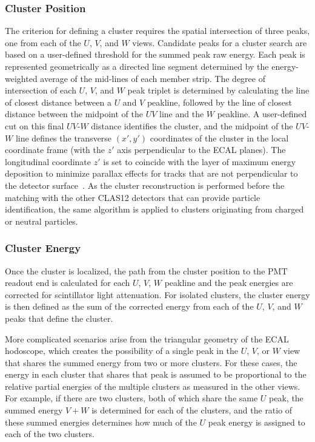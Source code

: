 \subsubsection {Cluster Position}
\label{ec-cluster}

The criterion for defining a cluster requires the spatial intersection of three peaks, one from each of the $U$,
$V$, and $W$ views. Candidate peaks for a cluster search are based on a user-defined threshold for the
summed peak raw energy. Each peak is represented geometrically as a directed line segment determined by the
energy-weighted average of the mid-lines of each member strip. The degree of intersection of each $U$, $V$,
and $W$ peak triplet is determined by calculating the line of closest distance between a $U$ and $V$ peakline,
followed by the line of closest distance between the midpoint of the $UV$ line and the $W$ peakline. A
user-defined cut on this final $UV$-$W$ distance identifies the cluster, and the midpoint of the $UV$-$W$
line defines the transverse $(x',y')$ coordinates of the cluster in the local coordinate frame (with the $z'$
axis perpendicular to the ECAL planes). The longitudinal coordinate $z'$ is set to coincide with the layer of
maximum energy deposition to minimize parallax effects for tracks that are not perpendicular to the detector
surface~\cite{ecal-nim}. As the cluster reconstruction is performed before the matching with the other CLAS12
detectors that can provide particle identification, the same algorithm is applied to clusters originating from
charged or neutral particles.

\subsubsection {Cluster Energy}

Once the cluster is localized, the path from the cluster position to the PMT readout end is calculated for each $U$,
$V$, $W$ peakline and the peak energies are corrected for scintillator light attenuation. For isolated clusters,
the cluster energy is then defined as the sum of the corrected energy from each of the $U$, $V$, and $W$ peaks
that define the cluster.

More complicated scenarios arise from the triangular geometry of the ECAL hodoscope, which creates the
possibility of a single peak in the $U$, $V$, or $W$ view that shares the summed energy from two or more
clusters. For these cases, the energy in each cluster that shares that peak is assumed to be proportional to the
relative partial energies of the multiple clusters as measured in the other views. For example, if there are two
clusters, both of which share the same $U$ peak, the summed energy $V+W$ is determined for each of the
clusters, and the ratio of these summed energies determines how much of the $U$ peak energy is assigned to
each of the two clusters.

